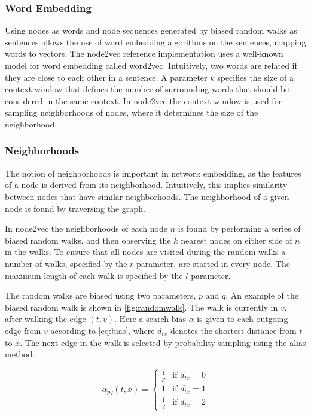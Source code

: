 \subsubsection{Word Embedding}
Using nodes as words and node sequences generated by biased random walks as sentences allows the use of word embedding algorithms on the sentences, mapping words to vectors. The node2vec reference implementation uses a well-known model for word embedding called word2vec. Intuitively, two words are related if they are close to each other in a sentence. A parameter $k$ specifies the size of a context window that defines the number of surrounding words that should be considered in the same context. In node2vec the context window is used for sampling neighborhoods of nodes, where it determines the size of the neighborhood.

\subsubsection{Neighborhoods}
The notion of neighborhoods is important in network embedding, as the features of a node is derived from its neighborhood. Intuitively, this implies similarity between nodes that have similar neighborhoods. The neighborhood of a given node is found by traversing the graph.

In node2vec the neighborhoods of each node $n$ is found by performing a series of biased random walks, and then observing the $k$ nearest nodes on either side of $n$ in the walks. To ensure that all nodes are visited during the random walks a number of walks, specified by the $r$ parameter, are started in every node. The maximum length of each walk is specified by the $l$ parameter.

The random walks are biased using two parameters, $p$ and $q$. An example of the biased random walk is shown in \cref{fig:randomwalk}. The walk is currently in $v$, after walking the edge $(t,v)$. Here a search bias $\alpha$ is given to each outgoing edge from $v$ according to \cref{eq:bias}, where $d_{tx}$ denotes the shortest distance from $t$ to $x$. The next edge in the walk is selected by probability sampling using the alias method.

\begin{equation}
\label{eq:bias}
\alpha_{pq}(t,x)=
\begin{cases}
  \frac{1}{p} & \text{if } d_{tx}=0 \\
  1           & \text{if } d_{tx}=1 \\
  \frac{1}{q} & \text{if } d_{tx}=2
\end{cases}
\end{equation}

